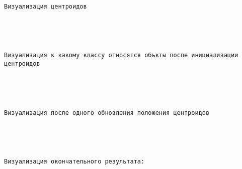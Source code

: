 \documentclass[11pt]{article}
\begin{document}
    \begin{center}
    \end{center}
    { \hspace*{\fill} \\}
    
    \begin{Verbatim}[commandchars=\\\{\}]


Визуализация центроидов
\end{Verbatim}

    \begin{center}
    \end{center}
    { \hspace*{\fill} \\}
    
    \begin{Verbatim}[commandchars=\\\{\}]


Визуализация к какому классу относятся объкты после инициализации центроидов
\end{Verbatim}

    \begin{center}
    \end{center}
    { \hspace*{\fill} \\}
    
    \begin{Verbatim}[commandchars=\\\{\}]


Визуализация после одного обновления положения центроидов
\end{Verbatim}

    \begin{center}
    \end{center}
    { \hspace*{\fill} \\}
    
    \begin{Verbatim}[commandchars=\\\{\}]


Визуализация окончательного результата:
\end{Verbatim}
\end{document}
